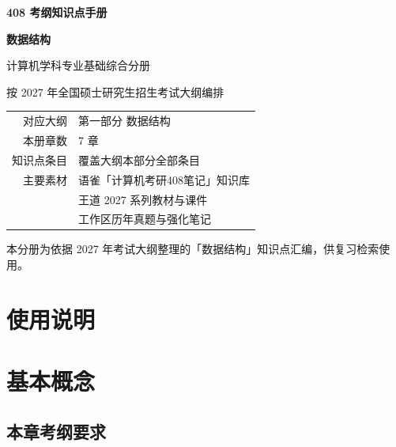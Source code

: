 \documentclass[11pt,openany,UTF8]{ctexbook}
\begin{document}
\begin{titlepage}
\centering
\vspace*{3.0cm}
{\Huge\bfseries 408 考纲知识点手册\par}
\vspace{0.6cm}
{\LARGE\bfseries 数据结构\par}
\vspace{0.9cm}
{\large 计算机学科专业基础综合\quad 分册\par}
\vspace{0.35cm}
{\large 按 2027 年全国硕士研究生招生考试大纲编排\par}
\vspace{2.0cm}
{\normalsize
\begin{tabular}{rl}
对应大纲 & 第一部分 数据结构 \\
本册章数 & 7 章 \\
知识点条目 & 覆盖大纲本部分全部条目 \\
主要素材 & 语雀「计算机考研408笔记」知识库 \\
           & 王道 2027 系列教材与课件 \\
           & 工作区历年真题与强化笔记 \\
\end{tabular}\par}
\vfill
{\small 本分册为依据 2027 年考试大纲整理的「数据结构」知识点汇编，供复习检索使用。\par}
\vspace{1.2cm}
\end{titlepage}


\frontmatter
\pagestyle{fancy}
\chapter*{使用说明}

\cleardoublepage
\tableofcontents
\mainmatter

\chapter{基本概念}
\section*{本章考纲要求}
\end{document}
